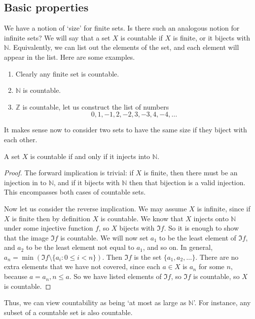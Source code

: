 \subsection{Basic properties}
We have a notion of `size' for finite sets.
Is there such an analogous notion for infinite sets?
We will say that a set \(X\) is countable if \(X\) is finite, or it bijects with \(\mathbb N\).
Equivalently, we can list out the elements of the set, and each element will appear in the list.
Here are some examples.
\begin{enumerate}
	\item Clearly any finite set is countable.
	\item \(\mathbb N\) is countable.
	\item \(\mathbb Z\) is countable, let us construct the list of numbers
	      \[
		      0, 1, -1, 2, -2, 3, -3, 4, -4, \dots
	      \]
\end{enumerate}
It makes sense now to consider two sets to have the same size if they biject with each other.
\begin{proposition}
	A set \(X\) is countable if and only if it injects into \(\mathbb N\).
\end{proposition}
\begin{proof}
	The forward implication is trivial: if \(X\) is finite, then there must be an injection in to \(\mathbb N\), and if it bijects with \(\mathbb N\) then that bijection is a valid injection.
	This encompasses both cases of countable sets.

	Now let us consider the reverse implication.
	We may assume \(X\) is infinite, since if \(X\) is finite then by definition \(X\) is countable.
	We know that \(X\) injects onto \(\mathbb N\) under some injective function \(f\), so \(X\) bijects with \(\Im f\).
	So it is enough to show that the image \(\Im f\) is countable.
	We will now set \(a_1\) to be the least element of \(\Im f\), and \(a_2\) to be the least element not equal to \(a_1\), and so on.
	In general, \(a_n = \min (\Im f \setminus \{ a_i : 0 \leq i < n \})\).
	Then \(\Im f\) is the set \(\{ a_1, a_2, \dots \}\).
	There are no extra elements that we have not covered, since each \(a \in X\) is \(a_n\) for some \(n\), because \(a=a_n, n \leq a\).
	So we have listed elements of \(\Im f\), so \(\Im f\) is countable, so \(X\) is countable.
\end{proof}
Thus, we can view countability as being `at most as large as \(\mathbb N\)'.
For instance, any subset of a countable set is also countable.

